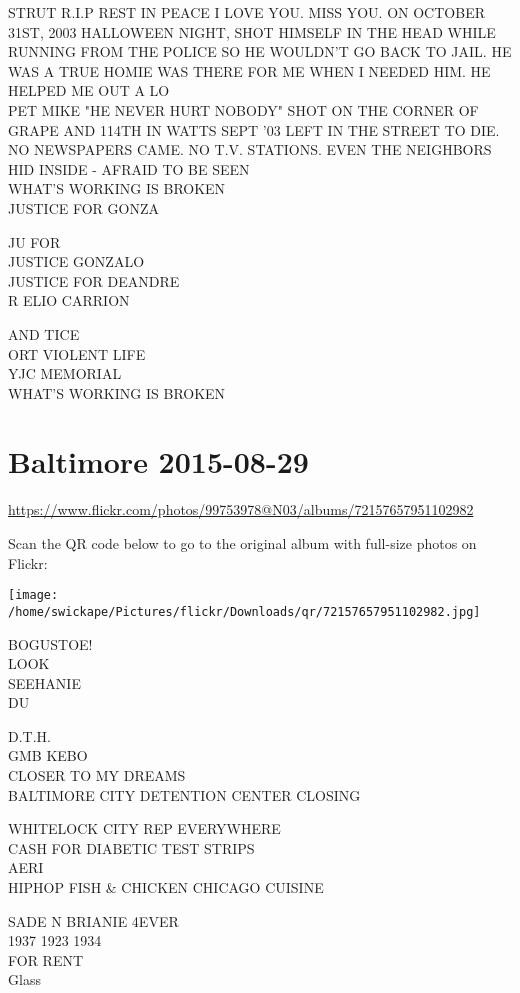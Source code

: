 \documentclass[10pt,letterpaper]{article}
\begin{document}
STRUT R.I.P REST IN PEACE I LOVE YOU.  MISS YOU.  ON OCTOBER 31ST, 2003 HALLOWEEN NIGHT, SHOT HIMSELF IN THE HEAD WHILE RUNNING FROM THE POLICE SO HE WOULDN'T GO BACK TO JAIL.  HE WAS A TRUE HOMIE WAS THERE FOR ME WHEN I NEEDED HIM.  HE HELPED ME OUT A LO\\
PET MIKE "HE NEVER HURT NOBODY" SHOT ON THE CORNER OF GRAPE AND 114TH IN WATTS SEPT '03 LEFT IN THE STREET TO DIE.  NO NEWSPAPERS CAME.  NO T.V. STATIONS.  EVEN THE NEIGHBORS HID INSIDE {-} AFRAID TO BE SEEN\\
WHAT'S WORKING IS BROKEN\\
JUSTICE FOR GONZA

JU FOR\\
JUSTICE GONZALO\\
JUSTICE FOR DEANDRE\\
R ELIO CARRION

AND TICE\\
ORT VIOLENT LIFE\\
YJC MEMORIAL\\
WHAT'S WORKING IS BROKEN


\section*{Baltimore 2015-08-29}

\url{https://www.flickr.com/photos/99753978@N03/albums/72157657951102982}

Scan the QR code below to go to the original album with full-size photos on Flickr:

\texttt{[image: /home/swickape/Pictures/flickr/Downloads/qr/72157657951102982.jpg]}


BOGUSTOE!\\
LOOK\\
SEEHANIE\\
DU

D.T.H.\\
GMB KEBO\\
CLOSER TO MY DREAMS\\
BALTIMORE CITY DETENTION CENTER CLOSING

WHITELOCK CITY REP EVERYWHERE\\
CASH FOR DIABETIC TEST STRIPS\\
AERI\\
HIPHOP FISH \& CHICKEN CHICAGO CUISINE

SADE N BRIANIE 4EVER\\
1937 1923 1934\\
FOR RENT\\
Glass
\end{document}
